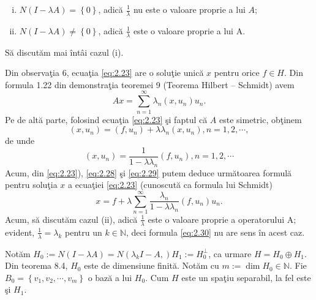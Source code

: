 \documentclass[a4paper,12pt,oneside]{report}
\begin{document}
\begin{enumerate}[(i)]
\item \(N\left ( I - \lambda A \right ) = \left \{ 0 \right \}\), adic\u{a} \(\frac{1}{\lambda}\) nu este o valoare proprie a lui \(A\);
\item \(N\left ( I - \lambda A \right ) \neq  \left \{ 0 \right \}\), adic\u{a} \(\frac{1}{\lambda}\) este o valoare proprie a lui A.
\end{enumerate}

\noindent S\u{a} discut\u{a}m mai \^{i}nt\^{a}i cazul (i).

Din observa\c{t}ia 6, ecua\c{t}ia \ref{eq:2.23} are o solu\c{t}ie unic\u{a} $x$
pentru orice \(f\in H\). Din formula 1.22 din demonstra\c{t}ia teoremei 9 (Teorema Hilbert – Schmidt) avem
\begin{displaymath}
Ax = \sum_{n=1}^{\infty }\lambda_{n}\left ( x,u_{n} \right )u_{n}. \label{eq:2.28} \tag{2.28}
\end{displaymath}
Pe de alt\u{a} parte, folosind ecua\c{t}ia \ref{eq:2.23} \c{s}i faptul c\u{a} \(A\) este simetric, ob\c{t}inem
\begin{displaymath}
\left ( x,u_{n} \right ) = \left ( f,u_{n} \right ) + \lambda \lambda _{n}\left ( x,u_{n} \right ), n = 1,2,\cdots,
\end{displaymath}
de unde
\begin{displaymath}
\left ( x,u_{n} \right ) = \frac{1}{1 - \lambda \lambda _{n}}\left ( f,u_{n} \right ), n = 1,2,\cdots \label{eq:2.29} \tag{2.29}
\end{displaymath}
Acum, din \ref{eq:2.23}), \ref{eq:2.28} \c{s}i \ref{eq:2.29}  putem deduce urm\u{a}toarea formul\u{a} pentru solu\c{t}ia $x$ a ecua\c{t}iei \ref{eq:2.23} (cunoscut\u{a} ca formula lui Schmidt)
\begin{displaymath}
x = f + \lambda \sum_{n=1}^{\infty }\frac{\lambda_{n}}{1 - \lambda \lambda_{n}}\left ( f, u_{n} \right )u_{n}. \label{eq:2.30} \tag{2.30}
\end{displaymath}
Acum, s\u{a} discut\u{a}m cazul (ii), adic\u{a}  \(\frac{1}{\lambda}\) este o valoare proprie a operatorului A; evident, \(\frac{1}{\lambda} = \lambda_{k}\) pentru un \(k \in \mathbb{N}\), deci formula \ref{eq:2.30} nu are sens \^{i}n acest caz.

\noindent Not\u{a}m \(H_{0}:= N\left ( I - \lambda A \right ) = N \left ( \lambda_{k}I - A, \right ) H_{1}:= H_{0}^{\perp }\), ca urmare \(H = H_{0}\oplus H_{1}\). Din teorema 8.4, \(H_{0}\) este de dimensiune finit\u{a}. Not\u{a}m cu \(m:= \dim H_{0}\in \mathbb{N}\). Fie \(B_{0} = \left \{ v_{1}, v_{2},\cdots,v_{m} \right \}\) o baz\u{a} a lui \(H_{0}\). Cum \(H\) este un spa\c{t}iu separabil, la fel este \c{s}i \(H_{1}\).
\end{document}
